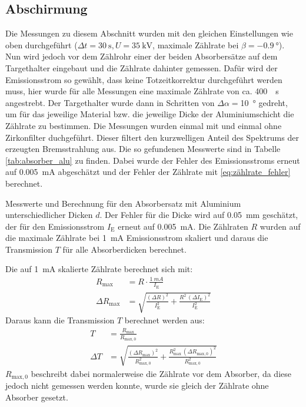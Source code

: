 \documentclass[11pt, a4paper]{article}
\numberwithin{equation}{section}
\begin{document}
\subsection{Abschirmung}

Die Messungen zu diesem Abschnitt wurden mit den gleichen Einstellungen wie oben durchgeführt ($\Delta t=\SI{30}{\second}, U=\SI{35}{\kilo\volt}$, maximale Zählrate bei $\beta=\SI{-0.9}{\degree}$).
Nun wird jedoch vor dem Zählrohr einer der beiden Absorbersätze auf dem Targethalter eingebaut und die Zählrate dahinter gemessen.
Dafür wird der Emissionsstrom so gewählt, dass keine Totzeitkorrektur durchgeführt werden muss, hier wurde für alle Messungen eine maximale Zählrate von ca. \SI{400}{\per\second} angestrebt.
Der Targethalter wurde dann in Schritten von $\Delta\alpha=$\SI{10}{\degree} gedreht, um für das jeweilige Material bzw. die jeweilige Dicke der Aluminiumschicht die Zählrate zu bestimmen.
Die Messungen wurden einmal mit und einmal ohne Zirkonfilter duchgeführt.
Dieser filtert den kurzwelligen Anteil des Spektrums der erzeugten Bremsstrahlung aus.
Die so gefundenen Messwerte sind in Tabelle \ref{tab:absorber_alu} zu finden.
Dabei wurde der Fehler des Emissionsstroms erneut auf \SI{0.005}{\milli\ampere} abgeschätzt und der Fehler der Zählrate mit \eqref{eq:zählrate_fehler} berechnet.
\begin{table}[ht]
	\centering
	\resizebox{\textwidth}{!}{
	}
	\caption{Messwerte und Berechnung für den Absorbersatz mit Aluminium unterschiedlicher Dicken $d$. Der Fehler für die Dicke wird auf \SI{0.05}{mm} geschätzt, der für den Emissionsstrom $I_\mathrm{E}$ erneut auf \SI{0.005}{mA}.
	Die Zählraten $R$ wurden auf die maximale Zählrate bei \SI{1}{mA} Emissionsstrom skaliert und daraus die Transmission $T$ für alle Absorberdicken berechnet.}
	\label{tab:absorber_alu}
\end{table}
Die auf \SI{1}{mA} skalierte Zählrate berechnet sich mit:
\begin{align}
	R_\mathrm{max} &= R\cdot\frac{\SI{1}{mA}}{I_\mathrm{E}}\\
	\Delta R_\mathrm{max} &= \sqrt{\frac{(\Delta R)^2}{I_\mathrm{E}^2} + \frac{R^2\,(\Delta I_\mathrm{E})^2}{I_\mathrm{E}^2}}
\end{align}
Daraus kann die Transmission $T$ berechnet werden aus:
\begin{align}
	T &= \frac{R_\mathrm{max}}{R_\mathrm{max, 0}}\\
	\Delta T &= \sqrt{\frac{(\Delta R_\mathrm{max})^2}{R_\mathrm{max, 0}^2} + \frac{R_\mathrm{max}^2\,(\Delta R_\mathrm{max, 0})^2}{R_\mathrm{max, 0}^2}} 
\end{align}
$R_\mathrm{max, 0}$ beschreibt dabei normalerweise die Zählrate vor dem Absorber, da diese jedoch nicht gemessen werden konnte, wurde sie gleich der Zählrate ohne Absorber gesetzt.
\end{document}
